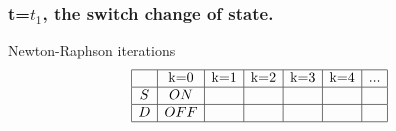  \frame
{

\frametitle{t=$t_1$, the switch change of state.}

  \begin{figure}[!h]
   \centerline{
   \scalebox{0.9}{
    
    }
 } 
 \end{figure}

 \begin{block}{Newton-Raphson iterations}
\begin{equation}
\begin{array}{|c|c|c|c|c|c|c|}
\hline
&$k=0$&$k=1$&$k=2$&$k=3$&$k=4$&...\\
\hline
S&ON&&&&&\\
\hline
D&OFF&&&&&\\
\hline
\end{array}
\end{equation}
\end{block}


 }

